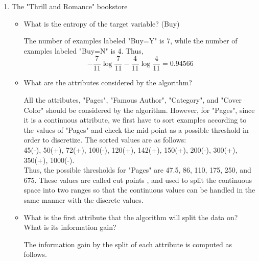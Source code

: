 \begin{enumerate}
\item The "Thrill and Romance" bookstore

\begin{itemize}
\item What is the entropy of the target variable? (Buy)

The number of examples labeled "Buy=Y" is 7, while the number of examples labeled "Buy=N" is 4. Thus,
\[
-\frac{7}{11}\log \frac{7}{11}-\frac{4}{11}\log \frac{4}{11}=0.94566
\]

\item What are the attributes considered by the algorithm?

All the attributes, "Pages", "Famous Author", "Category", and "Cover Color" should be considered by the algorithm. However, for "Pages", since it is a continuous attribute, we first have to sort examples according to the values of "Pages" and check the mid-point as a possible threshold in order to discretize. The sorted values are as follows:\\
45(-), 50(+), 72(+), 100(-), 120(+), 142(+), 150(+), 200(-), 300(+), 350(+), 1000(-).\\
Thus, the possible thresholds for "Pages" are 47.5, 86, 110, 175, 250, and 675. These values are called cut points \cite{fayyad1992}, and used to split the continuous space into two ranges so that the continuous values can be handled in the same manner with the discrete values.

\item What is the first attribute that the algorithm will split the data on? What is its information gain?

The information gain by the split of each attribute is computed as follows.


\end{itemize}
\end{enumerate}
